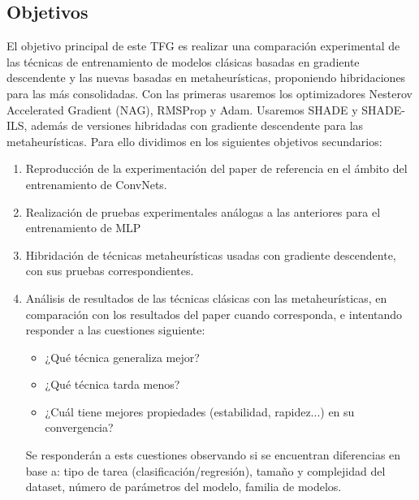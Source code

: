 \subsection{Objetivos}

El objetivo principal de este TFG es realizar una comparación experimental de las técnicas de entrenamiento de modelos clásicas basadas en gradiente descendente y las nuevas basadas en metaheurísticas, proponiendo hibridaciones para las más consolidadas. Con las primeras usaremos los optimizadores Nesterov Accelerated Gradient (NAG), RMSProp y Adam. Usaremos SHADE y SHADE-ILS, además de versiones hibridadas con gradiente descendente para las metaheurísticas. Para ello dividimos en los siguientes objetivos secundarios:


\begin{enumerate}

\item Reproducción de la experimentación del paper de referencia en el ámbito del entrenamiento de ConvNets.

\item Realización de pruebas experimentales análogas a las anteriores para el entrenamiento de MLP

\item Hibridación de técnicas metaheurísticas usadas con gradiente descendente, con sus pruebas correspondientes.

\item{Análisis de resultados de las técnicas clásicas con las metaheurísticas, en comparación con los resultados del paper cuando corresponda, e intentando responder a las cuestiones siguiente:
	\begin{itemize}
		\item ¿Qué técnica generaliza mejor?
		
		\item ¿Qué técnica tarda menos?
		
		\item ¿Cuál tiene mejores propiedades (estabilidad, rapidez...) en su convergencia?
	\end{itemize}
	
	Se responderán a ests cuestiones observando si se encuentran diferencias en base a: tipo de tarea (clasificación/regresión), tamaño y complejidad del dataset, número de parámetros del modelo, familia de modelos.
	
	}

\end{enumerate}
